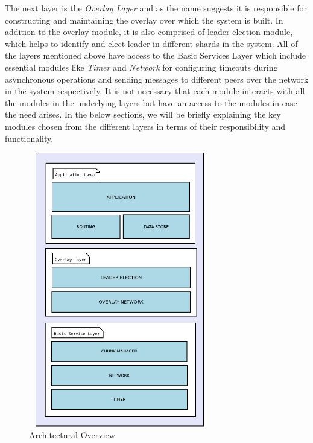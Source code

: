 \documentclass[a4paper,11pt]{kth-mag}
\begin{document}
\par The next layer is the \textit{Overlay Layer} and as the name suggests it is responsible for constructing and maintaining the overlay over which the system is built. In addition to the overlay module, it is also comprised of leader election module, which helps to identify and elect leader in different shards in the system. All of the layers mentioned above have access to the Basic Services Layer which include essential modules like \textit{Timer} and \textit{Network} for configuring timeouts during asynchronous operations and sending messages to different peers over the network in the system respectively. It is not necessary that each module interacts with all the modules in the underlying layers but have an access to the modules in case the need arises. In the below sections, we will be briefly explaining the key modules chosen from the different layers in terms of their responsibility and functionality.


\begin{figure}[h]
	\includegraphics[width=8cm, height=12cm]{architecture_new}
	\centering
	\caption{Architectural Overview}
	\label{fig:architecture}
\end{figure}


\end{document}
